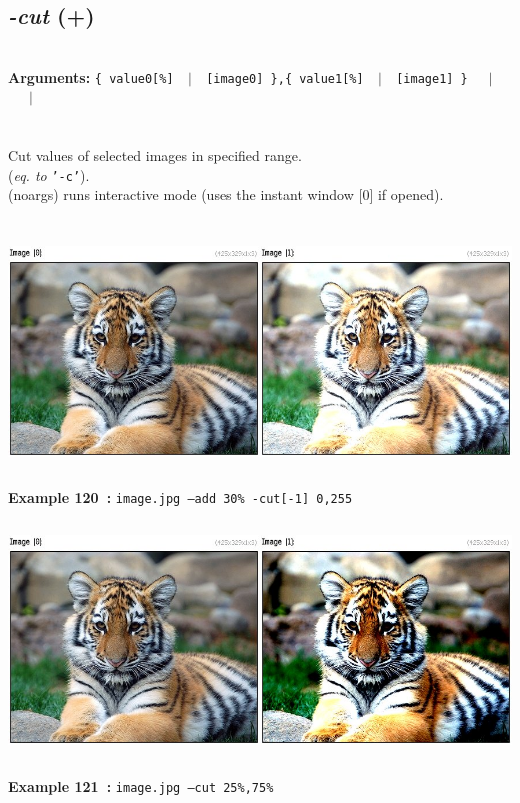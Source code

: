 \documentclass[a4paper,11pt,twoside]{book}
\begin{document}
\subsection{\emph{-cut} (+)}\vspace*{-0.5em}
~\\\textbf{Arguments: } 
{\small \texttt{\{ value0[\%] ~$|$~ [image0] \},\{ value1[\%] ~$|$~ [image1] \}}}~~~$|$\\
\hspace*{2.2cm}{\small \texttt{[image]}}~~~$|$\\
\\~\\
Cut values of selected images in specified range.
~\\(\emph{eq. to} {\small \texttt{'-c'}}).
~\\(noargs) runs interactive mode (uses the instant window [0] if opened).
\begin{center}\includegraphics[keepaspectratio=true,height=7cm,width=\textwidth]{img/gmic_def120.jpg}\\
{\footnotesize \textbf{Example 120~:} \texttt{image.jpg --add 30\% -cut[-1] 0,255}}
\\\includegraphics[keepaspectratio=true,height=7cm,width=\textwidth]{img/gmic_def121.jpg}\\
{\footnotesize \textbf{Example 121~:} \texttt{image.jpg --cut 25\%,75\%}}
\end{center}
\end{document}
